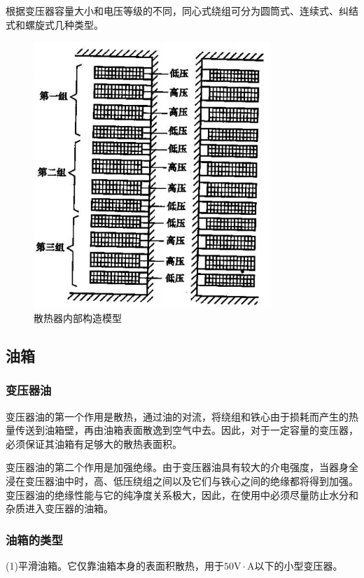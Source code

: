 \documentclass{book}
\begin{document}
根据变压器容量大小和电压等级的不同，同心式绕组可分为圆筒式、连续式、纠结式和螺旋式几种类型。
\begin{figure}[H]
	\centering
	\includegraphics[width=0.80\textwidth]{2-5.png} %
	\caption{散热器内部构造模型}
	\label{fig_2.5}
\end{figure}
\subsection{油箱}
\subsubsection{变压器油}

变压器油的第一个作用是散热，通过油的对流，将绕组和铁心由于损耗而产生的热量传送到油箱壁，再由油箱表面散逸到空气中去。因此，对于一定容量的变压器，必须保证其油箱有足够大的散热表面积。

变压器油的第二个作用是加强绝缘。由于变压器油具有较大的介电强度，当器身全浸在变压器油中时，高、低压绕组之间以及它们与铁心之间的绝缘都将得到加强。变压器油的绝缘性能与它的纯净度关系极大，因此，在使用中必须尽量防止水分和杂质进入变压器的油箱。

\subsubsection{油箱的类型}

(1)平滑油箱。它仅靠油箱本身的表面积散热，用于$50\text{V}\cdot \text{A}$以下的小型变压器。
\end{document}
